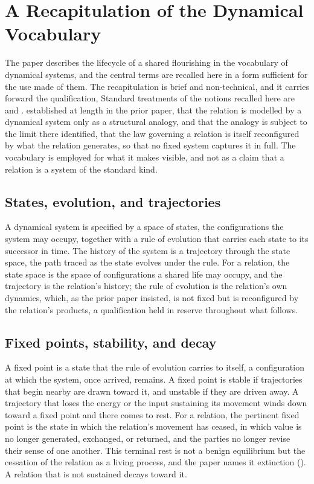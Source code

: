 \section{A Recapitulation of the Dynamical Vocabulary}
\label{p11:sec:dynsys}

\noindent
The paper describes the lifecycle of a shared flourishing in the vocabulary of dynamical systems, and the central terms are recalled here in a form sufficient for the use made of them. The recapitulation is brief and non-technical, and it carries forward the qualification, Standard treatments of the notions recalled here are \textcite{strogatz1994} and \textcite{hirsch2013}. established at length in the prior paper, that the relation is modelled by a dynamical system only as a structural analogy, and that the analogy is subject to the limit there identified, that the law governing a relation is itself reconfigured by what the relation generates, so that no fixed system captures it in full. The vocabulary is employed for what it makes visible, and not as a claim that a relation is a system of the standard kind.

\subsection{States, evolution, and trajectories}
\label{p11:sec:dyn-states}

A dynamical system is specified by a space of states, the configurations the system may occupy, together with a rule of evolution that carries each state to its successor in time. The history of the system is a trajectory through the state space, the path traced as the state evolves under the rule. For a relation, the state space is the space of configurations a shared life may occupy, and the trajectory is the relation's history; the rule of evolution is the relation's own dynamics, which, as the prior paper insisted, is not fixed but is reconfigured by the relation's products, a qualification held in reserve throughout what follows.

\subsection{Fixed points, stability, and decay}
\label{p11:sec:dyn-fixed}

A fixed point is a state that the rule of evolution carries to itself, a configuration at which the system, once arrived, remains. A fixed point is stable if trajectories that begin nearby are drawn toward it, and unstable if they are driven away. A trajectory that loses the energy or the input sustaining its movement winds down toward a fixed point and there comes to rest. For a relation, the pertinent fixed point is the state in which the relation's movement has ceased, in which value is no longer generated, exchanged, or returned, and the parties no longer revise their sense of one another. This terminal rest is not a benign equilibrium but the cessation of the relation as a living process, and the paper names it extinction (). A relation that is not sustained decays toward it.

